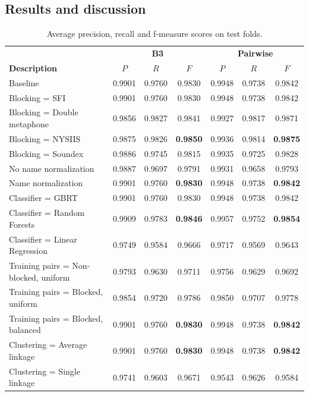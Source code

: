 \documentclass{article}
\begin{document}
\subsection{Results and discussion}

\begin{table}
\caption{Average precision, recall and f-measure scores on test folds.}
\label{table:results}
\centering
\begin{tabular}{|l|c c c|c c c|}
  \hline
                       & \multicolumn{3}{|c|}{\textbf{B3}} & \multicolumn{3}{|c|}{\textbf{Pairwise}} \\
  \textbf{Description} & $P$ & $R$ & $F$ & $P$ & $R$ & $F$\\
  \hline
  \hline
Baseline & 0.9901 & 0.9760 & 0.9830 & 0.9948 & 0.9738 & 0.9842 \\
\hline
Blocking = SFI & 0.9901 & 0.9760 & 0.9830 & 0.9948 & 0.9738 & 0.9842 \\
Blocking = Double metaphone & 0.9856 & 0.9827 & 0.9841 & 0.9927 & 0.9817 & 0.9871 \\
Blocking = NYSIIS & 0.9875 & 0.9826 & \textbf{0.9850} & 0.9936 & 0.9814 & \textbf{0.9875} \\
Blocking = Soundex & 0.9886 & 0.9745 & 0.9815 & 0.9935 & 0.9725 & 0.9828 \\
\hline
No name normalization & 0.9887 & 0.9697 & 0.9791 & 0.9931 & 0.9658 & 0.9793 \\
Name normalization & 0.9901 & 0.9760 & \textbf{0.9830} & 0.9948 & 0.9738 & \textbf{0.9842} \\
\hline
Classifier = GBRT & 0.9901 & 0.9760 & 0.9830 & 0.9948 & 0.9738 & 0.9842 \\
Classifier = Random Forests & 0.9909 & 0.9783 & \textbf{0.9846} & 0.9957 & 0.9752 & \textbf{0.9854} \\
Classifier = Linear Regression & 0.9749 & 0.9584 & 0.9666 & 0.9717 & 0.9569 & 0.9643 \\
\hline
Training pairs = Non-blocked, uniform & 0.9793 & 0.9630 & 0.9711 & 0.9756 & 0.9629 & 0.9692 \\
Training pairs = Blocked, uniform & 0.9854 & 0.9720 & 0.9786 & 0.9850 & 0.9707 & 0.9778 \\
Training pairs = Blocked, balanced & 0.9901 & 0.9760 & \textbf{0.9830} & 0.9948 & 0.9738 & \textbf{0.9842} \\
\hline
Clustering = Average linkage & 0.9901 & 0.9760 & \textbf{0.9830} & 0.9948 & 0.9738 & \textbf{0.9842} \\
Clustering = Single linkage & 0.9741 & 0.9603 & 0.9671 & 0.9543 & 0.9626 & 0.9584 \\

\end{tabular}
\end{table}
\end{document}
